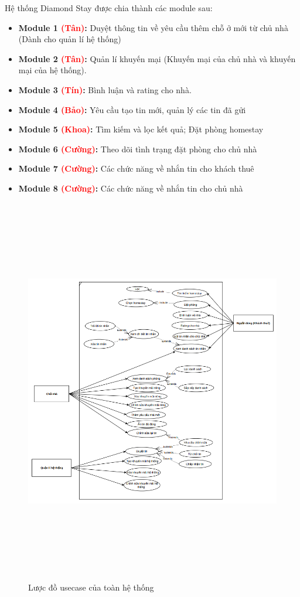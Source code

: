 Hệ thống Diamond Stay được chia thành các module sau:
\begin{itemize}
	\item \textbf{Module 1 \textcolor{red}{(Tân)}:} Duyệt thông tin về yêu cầu thêm chỗ ở mới từ chủ nhà (Dành cho quản lí hệ thống) 
	\item \textbf{Module 2 \textcolor{red}{(Tân)}:} Quản lí khuyến mại (Khuyến mại của chủ nhà và khuyến mại của hệ thống).
	\item \textbf{Module 3 \textcolor{red}{(Tín)}:} Bình luận và rating cho nhà.
	\item \textbf{Module 4 \textcolor{red}{(Bảo)}:} Yêu cầu tạo tin mới, quản lý các tin đã gửi 
	\item \textbf{Module 5 \textcolor{red}{(Khoa)}:} Tìm kiếm và lọc kết quả; Đặt phòng homestay 
	\item \textbf{Module 6 \textcolor{red}{(Cường)}:} Theo dõi tình trạng đặt phòng cho chủ nhà
	\item \textbf{Module 7 \textcolor{red}{(Cường)}:} Các chức năng về nhắn tin cho khách thuê
	\item \textbf{Module 8 \textcolor{red}{(Cường)}:} Các chức năng về nhắn tin cho chủ nhà 
\end{itemize}
\newpage 
\begin{figure}[H]
	\centering
	\includegraphics[width=17cm, height= 17cm]{Image/ucFull.png}
	\vspace{0.5cm}
	\caption{Lược đồ usecase của toàn hệ thống}
\end{figure}